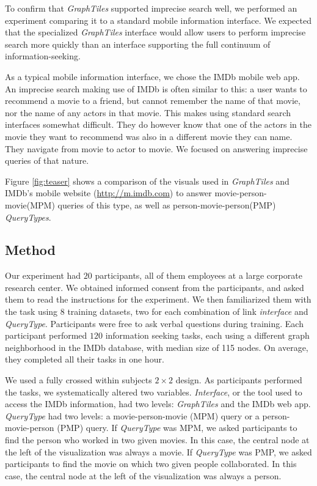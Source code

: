 To confirm that \textit{GraphTiles} supported imprecise search well, we performed an experiment comparing it to a standard mobile information interface. We expected that the specialized \textit{GraphTiles} interface would allow users to perform imprecise search more quickly than an interface supporting the full continuum of information-seeking.

As a typical mobile information interface, we chose the IMDb mobile web app. An imprecise search making use of IMDb is often similar to this: a user wants to recommend a movie to a friend, but cannot remember the name of that movie, nor the name of any actors in that movie. This makes using standard search interfaces somewhat difficult. They do however know that one of the actors in the movie they want to recommend was also in a different movie they can name. They navigate from movie to actor to movie. We focused on answering imprecise queries of that nature. 

Figure \ref{fig:teaser} shows a comparison of the visuals used in \textit{GraphTiles} and IMDb's mobile website (\url{http://m.imdb.com}) to answer movie-person-movie(MPM) queries of this type, as well as person-movie-person(PMP) \textit{QueryTypes}.


\subsection{Method}

Our experiment had $20$ participants, all of them employees at a large corporate research center.  We obtained informed consent from the participants, and asked them to read the instructions for the experiment. We then familiarized them with the task using 8 training datasets, two for each combination of link \textit{interface} and \textit{QueryType}. Participants were free to ask verbal questions during training. Each participant performed $120$ information seeking tasks, each using a different graph neighborhood in the IMDb database, with median size of 115 nodes. On average, they completed all their tasks in one hour.

We used a fully crossed within subjects $2 \times 2$ design. As participants performed the tasks, we systematically altered two variables. \textit{Interface}, or the tool used to access the IMDb information, had two levels: \textit{GraphTiles} and the IMDb web app. \textit{QueryType} had two levels: a movie-person-movie (MPM) query or a person-movie-person (PMP) query. If \textit{QueryType} was MPM, we asked participants to find the person who worked in two given movies. In this case, the central node at the left of the visualization was always a movie. If \textit{QueryType} was PMP, we asked participants to find the movie on which two given people collaborated. In this case, the central node at the left of the visualization was always a person. 

